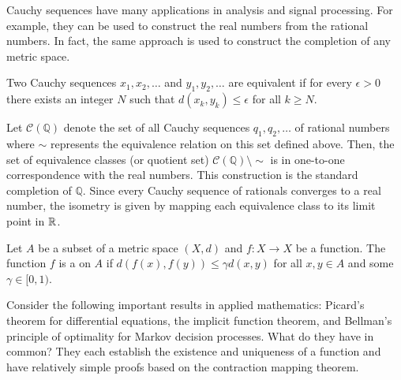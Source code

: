 Cauchy sequences have many applications in analysis and signal processing.
For example, they can be used to construct the real numbers from the rational numbers.
In fact, the same approach is used to construct the completion of any metric space.

\begin{definition}
Two Cauchy sequences $x_1, x_2, \ldots$ and $y_1, y_2, \ldots$ are equivalent if for every $\epsilon >0$ there exists an integer $N$ such that $d (x_k, y_k) \leq \epsilon$ for all $k \geq N$.
\end{definition}

\begin{example}
Let $\mathcal{C}(\mathbb{Q})$ denote the set of all Cauchy sequences $q_1, q_2, \ldots$ of rational numbers where $\sim$ represents the equivalence relation on this set defined above.
Then, the set of equivalence classes (or quotient set) $\mathcal{C}(\mathbb{Q}) \setminus \!\! \sim$ is in one-to-one correspondence with the real numbers.
This construction is the standard completion of $\mathbb{Q}$.
Since every Cauchy sequence of rationals converges to a real number, the isometry is given by mapping each equivalence class to its limit point in $\mathbb{R}$.
\end{example}

\begin{definition}
Let $A$ be a subset of a metric space $(X,d)$ and $f: X \rightarrow X$ be a function.
The function $f$ is a  on $A$ if $d \left( f(x),f(y) \right) \leq \gamma  d(x,y)$ for all $x,y\in A$ and some $\gamma \in [0,1)$.
\end{definition}

Consider the following important results in applied mathematics: Picard's theorem for differential equations, the implicit function theorem, and Bellman's principle of optimality for Markov decision processes.
What do they have in common?
They each establish the existence and uniqueness of a function and have relatively simple proofs based on the contraction mapping theorem.

